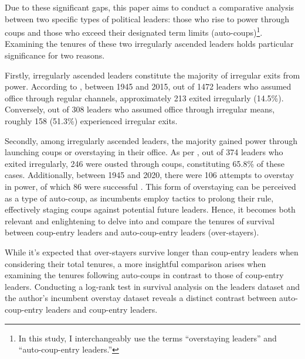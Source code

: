 \documentclass[
  12pt,
  a4paper,
  12pt]{article}
\begin{document}
Due to these significant gaps, this paper aims to conduct a comparative
analysis between two specific types of political leaders: those who rise
to power through coups and those who exceed their designated term limits
(auto-coups)\footnote{In this study, I interchangeably use the terms
  ``overstaying leaders'' and ``auto-coup-entry leaders.''}. Examining
the tenures of these two irregularly ascended leaders holds particular
significance for two reasons.

Firstly, irregularly ascended leaders constitute the majority of
irregular exits from power. According to \citet{goemans2009}, between
1945 and 2015, out of 1472 leaders who assumed office through regular
channels, approximately 213 exited irregularly (14.5\%). Conversely, out
of 308 leaders who assumed office through irregular means, roughly 158
(51.3\%) experienced irregular exits.

Secondly, among irregularly ascended leaders, the majority gained power
through launching coups or overstaying in their office. As per
\citep{goemans2009}, out of 374 leaders who exited irregularly, 246 were
ousted through coups, constituting 65.8\% of these cases. Additionally,
between 1945 and 2020, there were 106 attempts to overstay in power, of
which 86 were successful \citep{zhu2024}. This form of overstaying can
be perceived as a type of auto-coup, as incumbents employ tactics to
prolong their rule, effectively staging coups against potential future
leaders. Hence, it becomes both relevant and enlightening to delve into
and compare the tenures of survival between coup-entry leaders and
auto-coup-entry leaders (over-stayers).

While it's expected that over-stayers survive longer than coup-entry
leaders when considering their total tenures, a more insightful
comparison arises when examining the tenures following auto-coups in
contrast to those of coup-entry leaders. Conducting a log-rank test in
survival analysis on the leaders dataset \citep{goemans2009} and the
author's incumbent overstay dataset \citep{zhu2024} reveals a distinct
contrast between auto-coup-entry leaders and coup-entry leaders.
\end{document}
